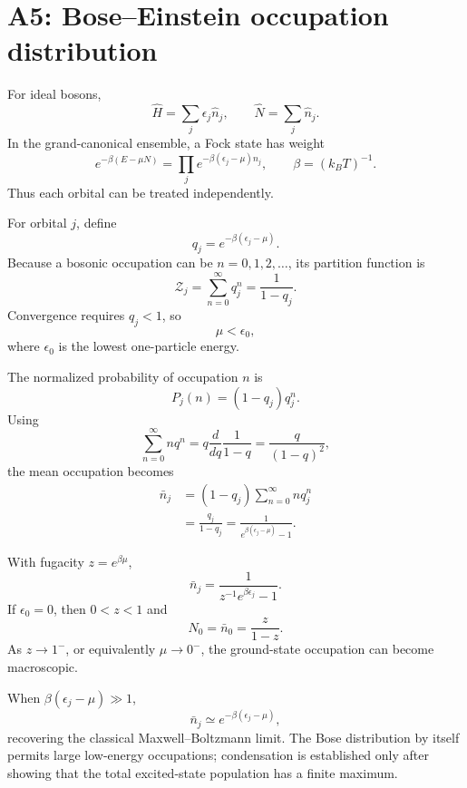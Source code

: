\section{A5: Bose--Einstein occupation distribution}

For ideal bosons,
\[
\hat H=\sum_j\epsilon_j\hat n_j,
\qquad
\hat N=\sum_j\hat n_j.
\]
In the grand-canonical ensemble, a Fock state has weight
\[
e^{-\beta(E-\mu N)}
=\prod_j e^{-\beta(\epsilon_j-\mu)n_j},
\qquad
\beta=(k_BT)^{-1}.
\]
Thus each orbital can be treated independently.

For orbital $j$, define
\[
q_j=e^{-\beta(\epsilon_j-\mu)}.
\]
Because a bosonic occupation can be $n=0,1,2,\ldots$, its partition function is
\[
\mathcal Z_j=\sum_{n=0}^\infty q_j^n=\frac1{1-q_j}.
\]
Convergence requires $q_j<1$, so
\[
\boxed{\mu<\epsilon_0,}
\]
where $\epsilon_0$ is the lowest one-particle energy.

The normalized probability of occupation $n$ is
\[
P_j(n)=(1-q_j)q_j^n.
\]
Using
\[
\sum_{n=0}^\infty nq^n
=q\frac{d}{dq}\frac1{1-q}
=\frac{q}{(1-q)^2},
\]
the mean occupation becomes
\[
\begin{aligned}
\bar n_j
&=(1-q_j)\sum_{n=0}^\infty nq_j^n\\
&=\frac{q_j}{1-q_j}
=\boxed{\frac1{e^{\beta(\epsilon_j-\mu)}-1}}.
\end{aligned}
\]

With fugacity $z=e^{\beta\mu}$,
\[
\boxed{
\bar n_j=\frac1{z^{-1}e^{\beta\epsilon_j}-1}.
}
\]
If $\epsilon_0=0$, then $0<z<1$ and
\[
N_0=\bar n_0=\frac{z}{1-z}.
\]
As $z\to1^-$, or equivalently $\mu\to0^-$, the ground-state occupation can
become macroscopic.

When $\beta(\epsilon_j-\mu)\gg1$,
\[
\bar n_j\simeq e^{-\beta(\epsilon_j-\mu)},
\]
recovering the classical Maxwell--Boltzmann limit. The Bose distribution by
itself permits large low-energy occupations; condensation is established only
after showing that the total excited-state population has a finite maximum.
